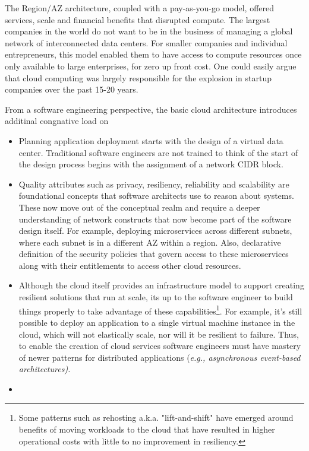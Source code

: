 \documentclass[conference]{IEEEconf}
\begin{document}
The Region/AZ architecture, coupled with a pay-as-you-go model, offered services, scale and financial benefits that disrupted compute.  The largest companies in the world do not want to be in the business of managing a global network of interconnected data centers. For smaller companies and individual entrepreneurs, this model enabled them to have access to compute resources once only available to large enterprises, for zero up front cost.  One could easily argue that cloud computing was largely responsible for the explosion in startup companies over the past 15-20 years. 

From a software engineering perspective, the basic cloud architecture introduces additinal congnative load on 

\begin{itemize}
	\item Planning application deployment starts with the design of a virtual data center. Traditional software engineers are not trained to think of the start of the design process begins with the assignment of a network CIDR block. 
	
	\item Quality attributes such as privacy, resiliency, reliability and scalability are foundational concepts that software architects use to reason about systems.  These now move out of the conceptual realm and require a deeper understanding of network constructs that now become part of the software design itself.  For example, deploying microservices across different subnets, where each subnet is in a different AZ within a region. Also, declarative definition of  the security policies that govern access to these microservices along with their entitlements to access other cloud resources. 
	
	\item Although the cloud itself provides an infrastructure model to support creating resilient solutions that run at scale, its up to the software engineer to build things properly to take advantage of these capabilities\footnote{Some patterns such as rehosting\cite{engelsrud2019moving} a.k.a. "lift-and-shift" have emerged around benefits of moving workloads to the cloud that have resulted in higher operational costs with little to no improvement in resiliency.}.  For example, it's still possible to deploy an application to a single virtual machine instance in the cloud, which will not elastically scale, nor will it be resilient to failure.  Thus, to enable the creation of cloud services software engineers must have mastery of newer patterns for distributed applications (\em{e.g.,} asynchronous event-based architectures).
	
	\item 
\end{itemize}
\end{document}
